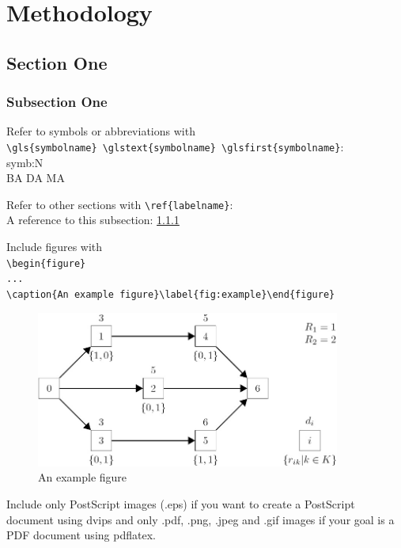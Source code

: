 \chapter{Methodology}\label{chapter:Methodology}
\section{Section One}\label{section:Section One}
\subsection{Subsection One}\label{labelname}

Refer to symbols or abbreviations with\\\verb+\gls{symbolname} \glstext{symbolname} \glsfirst{symbolname}+:\\
\gls{symb:N}  \\
\gls{BA} \gls{DA} \gls{MA}

Refer to other sections with \verb+\ref{labelname}+:\\
A reference to this subsection: \ref{labelname}

Include figures with\\
\verb+\begin{figure}+\\
\verb+...+\\
\verb+\caption{An example figure}\label{fig:example}\end{figure}+

\begin{figure}[h]
\begin{center}
\includegraphics[width=10cm]{images/example_figure}
\caption{An example figure}
\label{fig:example}
\end{center}
\end{figure}

Include only PostScript images (.eps) if you want to create a PostScript document using dvips and only .pdf, .png, .jpeg and .gif images if your goal is a PDF document using pdflatex.